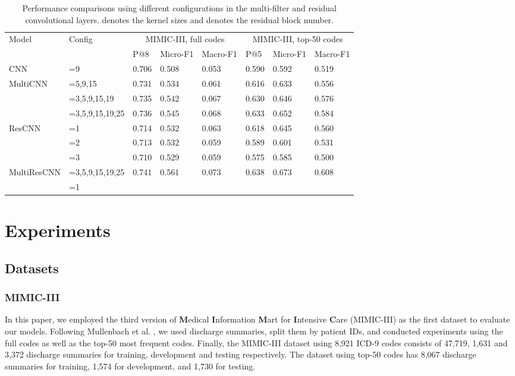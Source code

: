 \documentclass[letterpaper]{article} \usepackage{aaai20}  \usepackage{times}  \usepackage{helvet} \usepackage{courier}  \usepackage[hyphens]{url}  \usepackage{graphicx} \urlstyle{rm} \def\UrlFont{\rm}  \usepackage{graphicx}  \frenchspacing  \setlength{\pdfpagewidth}{8.5in}  \setlength{\pdfpageheight}{11in}
\begin{document}
\begin{table*}[t]
\caption{Performance comparisons using different configurations in the multi-filter and residual convolutional layers.  denotes the kernel sizes  and  denotes the residual block number.}\smallskip
\centering
\begin{tabular}{l|l|lll|lll}
\hline
\multirow{2}{*}{Model} & \multirow{2}{*}{Config} &  \multicolumn{3}{|c|}{MIMIC-III, full codes}  & \multicolumn{3}{|c}{MIMIC-III, top-50 codes}\\
 &  &  P@8  & Micro-F1 & Macro-F1 & P@5 & Micro-F1 & Macro-F1 \\
\hline
CNN & =9 & 0.706  & 0.508 & 0.053 & 0.590 & 0.592 & 0.519\\
\hline
 \multirow{3}{*}{MultiCNN} & =5,9,15 & 0.731  & 0.534 & 0.061 & 0.616 & 0.633 & 0.556\\
& =3,5,9,15,19 &  0.735  & 0.542 & 0.067 & 0.630 & 0.646 & 0.576\\
& =3,5,9,15,19,25 &  0.736  & 0.545 & 0.068 & 0.633& 0.652 & 0.584\\
\hline
\multirow{3}{*}{ResCNN}  & =1 & 0.714 & 0.532  & 0.063 &  0.618 & 0.645 & 0.560\\
 & =2 &  0.713 & 0.532  & 0.059 &0.589 & 0.601 & 0.531\\
 & =3 &  0.710  & 0.529  & 0.059 & 0.575& 0.585 & 0.500\\
\hline
\multirow{2}{*}{MultiResCNN} & =3,5,9,15,19,25 & \multirow{2}{*}{0.741} & \multirow{2}{*}{0.561}  & \multirow{2}{*}{0.073} & \multirow{2}{*}{0.638} & \multirow{2}{*}{0.673} & \multirow{2}{*}{0.608}\\
 & =1 &  &  &  & \\
\hline
\end{tabular}
\label{table:net_compare}
\end{table*}

\section{Experiments}
\subsection{Datasets}

\subsubsection{MIMIC-III}
In this paper, we employed the third version of \textbf{M}edical \textbf{I}nformation \textbf{M}art for \textbf{I}ntensive \textbf{C}are (MIMIC-III) \cite{johnson2016mimic} as the first dataset to evaluate our models. Following Mullenbach et al. , we used discharge summaries, split them by patient IDs, and conducted experiments using the full codes as well as the top-50 most frequent codes. Finally, the MIMIC-III dataset using 8,921 ICD-9 codes consists of 47,719, 1,631 and 3,372 discharge summaries for training, development and testing respectively. The dataset using top-50 codes has 8,067 discharge summaries for training, 1,574 for development, and 1,730 for testing.
\end{document}
